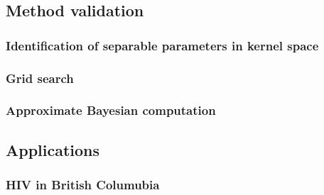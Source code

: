 \subsection{Method validation}

\subsubsection{Identification of separable parameters in kernel space}
\label{subsubsec:kernel}

\subsubsection{Grid search}

\subsubsection{Approximate Bayesian computation}

\subsection{Applications}

\subsubsection{HIV in British Columubia}
